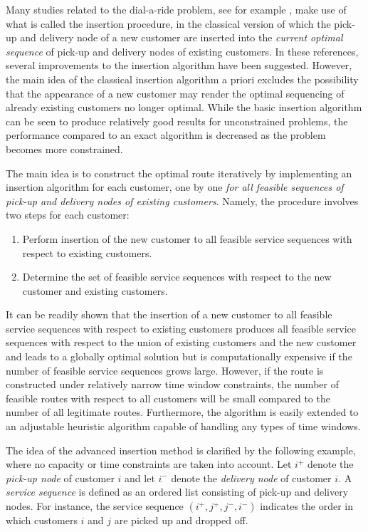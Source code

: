 \documentclass[dissertation,draft*]{aaltoseries}
\begin{document}
Many studies related to the dial-a-ride problem, see for example \cite{jaw,madsen,diana,wong},
make use of what is called the insertion procedure, in the classical version of which   
the pick-up and delivery node of a new customer are inserted into the 
\emph{current optimal sequence} of pick-up and delivery nodes of existing customers.
In these references, several improvements to the insertion algorithm 
have been suggested. However, the main idea of the classical insertion algorithm a priori
excludes the possibility that the appearance of a new customer may render
the optimal sequencing of already existing customers no longer optimal.
While the basic insertion algorithm can be seen to
produce relatively good results for unconstrained problems, 
the performance compared to an exact algorithm is decreased as the
problem becomes more constrained.

The main idea is to construct the optimal route iteratively by implementing 
an insertion algorithm for each customer, one by one \emph{for all feasible sequences 
of pick-up and delivery nodes of existing customers}.
Namely, the procedure involves two steps for each customer:
\begin{enumerate}
	\item 
	Perform insertion of the new customer to all feasible service sequences with respect to
	existing customers.
	\item
	Determine the set of feasible service sequences with respect to the new customer and existing customers.
\end{enumerate}

It can be readily shown that the insertion of a new customer to all feasible service sequences with respect to 
existing customers 
produces all feasible service sequences with respect to the union of existing customers 
and the new customer and leads to a globally optimal solution but is computationally expensive
if the number of feasible service sequences grows large. However, if the route is constructed under relatively narrow time window constraints,
the number of feasible routes with respect to all customers
will be small compared to the number of all legitimate routes. 
Furthermore, the algorithm is easily extended to an adjustable heuristic algorithm
capable of handling any types of time windows. 

The idea of the advanced insertion method is 
clarified by the following example, where no
capacity or time constraints are taken into account. 
Let $i^{+}$ denote the \emph{pick-up node} of customer $i$ and let $i^{-}$ denote 
the \emph{delivery node} of customer $i$.
A \emph{service sequence} is defined as an ordered list consisting of pick-up and delivery nodes.
For instance, the service sequence $( i^{+},  j^{+}, j^{-}, i^{-})$ indicates the order
in which customers $i$ and $j$ are picked up and dropped off.
\end{document}
